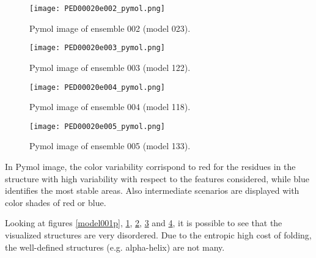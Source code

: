 \begin{figure}[H]
    \centering
		\texttt{[image: PED00020e002\_pymol.png]}
		\caption{Pymol image of ensemble 002 (model 023).}
		\label{model002p}
\end{figure}

\begin{figure}[H]
    \centering
		\texttt{[image: PED00020e003\_pymol.png]}
		\caption{Pymol image of ensemble 003 (model 122).}
		\label{model003p}
\end{figure}

\begin{figure}[H]
    \centering
		\texttt{[image: PED00020e004\_pymol.png]}
		\caption{Pymol image of ensemble 004 (model 118).}
		\label{model004p}
\end{figure}

\begin{figure}[H]
    \centering
		\texttt{[image: PED00020e005\_pymol.png]}
		\caption{Pymol image of ensemble 005 (model 133).}
		\label{model005p}
\end{figure}


\medskip
\medskip
In Pymol image, the color variability corrispond to red for the residues in the structure with high variability with respect to the features considered, while blue identifies the most stable areas. Also intermediate scenarios are displayed with color shades of red or blue.  

\medskip
Looking at figures \ref{model001p}, \ref{model002p}, \ref{model003p}, \ref{model004p} and \ref{model005p}, it is possible to see that the visualized structures are very disordered. Due to the entropic high cost of folding, the well-defined structures (e.g. alpha-helix) are not many. %
